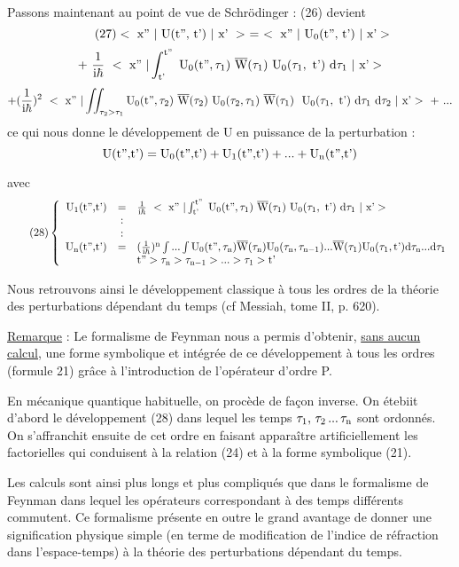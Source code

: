 Passons maintenant au point de vue de Schrödinger :
(26) devient
\[
\tag{27} <\text{ x'' }|\text{ U(t'', t') }|\text{ x' }>\ =\ <\text{ x'' }|\text{ U}_0\text{(t'', t') }|\text{ x'}>
\]
\[
+\ \frac{1}{\mt{i}\hbar}\ <\mt{ x'' }|\int_\mt{t'}^\mt{t''}\mt{ U}_0\mt{(t''}, \tau_1)\ \overline{\mt{W}}(\tau_1)
\mt{ U}_0(\tau_1,\mt{ t') }\mt{d}\tau_1\ |\mt{ x'}>
\]
\[
 +(\frac{1}{\mt{i}\hbar})^2\ <\mt{ x'' }|\iint_{\tau_2>\tau_1}\mt{U}_0\mt{(t''}, \tau_2)\ \overline{\mt{W}}(\tau_2)
\mt{ U}_0(\tau_2, \tau_1)\ \overline{\mt{W}}(\tau_1)\ \mt{ U}_0(\tau_1,\mt{ t'})\ \mt{d}\tau_1\ \mt{d}\tau_2\ |\mt{ x'}>\ +\ ...
\]
ce qui nous donne le développement de U en puissance de la perturbation :
\[
\text{U}\text{(t'',t'})=\text{U}_0\text{(t'',t'})+\text{U}_1\text{(t'',t'}) + ... +\text{U}_{\text{n}}\text{(t'',t'})
\]

avec
\[
\tag{28}\left\{ \begin{array}{rcl}
\mt{U}_1\mt{(t'',t'}) & = & \frac{1}{\mt{i}\hbar}\ <\mt{ x'' }|\int_\mt{t'}^\mt{t''}\mt{ U}_0\mt{(t''}, \tau_1)
\ \overline{\mt{W}}(\tau_1)\mt{ U}_0(\tau_1,\mt{ t') }\mt{d}\tau_1\ |\mt{ x'}> \\
 & : & \\
 & : & \\
\mt{U}_\mt{n}\mt{(t'',t'}) & = & (\frac{1}{\mt{i}\hbar})^\mt{n}\int...\int\mt{U}_0\mt{(t''},\tau_\mt{n})
\overline{\mt{W}}(\tau_\mt{n})\mt{U}_0(\tau_\mt{n},\tau_{\mt{n}-1})...\overline{\mt{W}}(\tau_1)
\mt{U}_0(\tau_1,\mt{t'})\mt{d}\tau_\mt{n}...\mt{d}\tau_1 \\
 &  & \mt{t''}>\tau_\mt{n}>\tau_{\mt{n}-1}>...>\tau_1>\mt{t'} \end{array}
\right. \]

Nous retrouvons ainsi le développement classique à tous les
ordres de la théorie des perturbations dépendant du temps (cf Messiah, tome II,
p. 620).

\ul{Remarque} :
Le formalisme de Feynman nous a permis d'obtenir, \ul{sans aucun} \ul{calcul}, une
forme symbolique et intégrée de ce développement à tous les ordres (formule 21)
grâce à l'introduction de l'opérateur d'ordre P.

En mécanique quantique habituelle, on procède de façon inverse.
On étebiit d'abord le développement (28) dans lequel les temps $\tau_1,\,\tau_2\,...\,\tau_{\text{n}}$
sont ordonnés. On s'affranchit ensuite de cet ordre en faisant apparaître artificiellement les factorielles
qui conduisent à la relation (24) et à la forme symbolique (21).

Les calculs sont ainsi plus longs et plus compliqués que dans
le formalisme de Feynman dans lequel les opérateurs correspondant à des temps
différents commutent. Ce formalisme présente en outre le grand avantage de
donner une signification physique simple (en terme de modification de
l'indice de réfraction dans l'espace-temps) à la théorie des perturbations
dépendant du temps.

